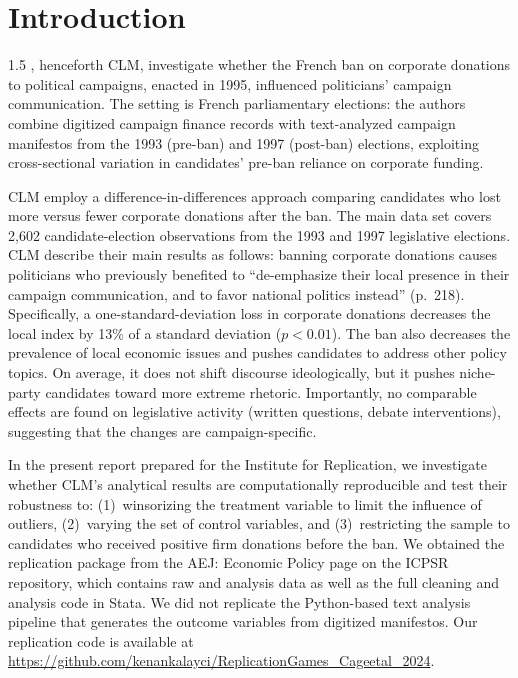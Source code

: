 \documentclass[12pt,a4paper]{article}
\begin{document}
\section{Introduction}
\begin{spacing}{1.5}
\cite{Cage}, henceforth CLM, investigate whether the French ban on corporate donations to political campaigns, enacted in 1995, influenced politicians' campaign communication. The setting is French parliamentary elections: the authors combine digitized campaign finance records with text-analyzed campaign manifestos from the 1993 (pre-ban) and 1997 (post-ban) elections, exploiting cross-sectional variation in candidates' pre-ban reliance on corporate funding.

CLM employ a difference-in-differences approach comparing candidates who lost more versus fewer corporate donations after the ban. The main data set covers 2,602 candidate-election observations from the 1993 and 1997 legislative elections. CLM describe their main results as follows: banning corporate donations causes politicians who previously benefited to ``de-emphasize their local presence in their campaign communication, and to favor national politics instead'' (p.~218). Specifically, a one-standard-deviation loss in corporate donations decreases the local index by 13\% of a standard deviation ($p<0.01$). The ban also decreases the prevalence of local economic issues and pushes candidates to address other policy topics. On average, it does not shift discourse ideologically, but it pushes niche-party candidates toward more extreme rhetoric. Importantly, no comparable effects are found on legislative activity (written questions, debate interventions), suggesting that the changes are campaign-specific.

In the present report prepared for the Institute for Replication, we investigate whether CLM's analytical results are computationally reproducible and test their robustness to: (1)~winsorizing the treatment variable to limit the influence of outliers, (2)~varying the set of control variables, and (3)~restricting the sample to candidates who received positive firm donations before the ban. We obtained the replication package from the AEJ: Economic Policy page on the ICPSR repository, which contains raw and analysis data as well as the full cleaning and analysis code in Stata. We did not replicate the Python-based text analysis pipeline that generates the outcome variables from digitized manifestos. Our replication code is available at \url{https://github.com/kenankalayci/ReplicationGames_Cageetal_2024}.


\end{spacing}
\end{document}
